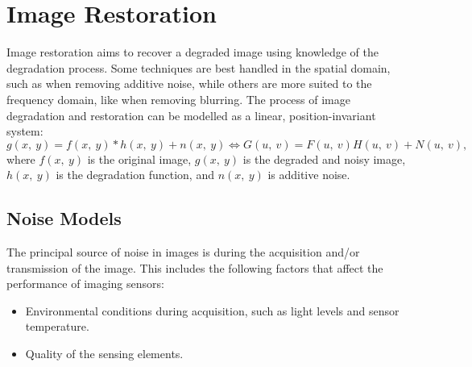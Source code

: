 \documentclass{article}
\begin{document}
\section{Image Restoration}
Image restoration aims to recover a degraded image using knowledge of
the degradation process. Some techniques are best handled in the
spatial domain, such as when removing additive noise, while others are
more suited to the frequency domain, like when removing blurring. The
process of image degradation and restoration can be modelled as a
linear, position-invariant system:
\begin{equation*}
    g\left( x,\: y \right) = f\left( x,\: y \right) \ast h\left( x,\: y \right) + n\left( x,\: y \right) \iff G\left( u,\: v \right) = F\left( u,\: v \right) H\left( u,\: v \right) + N\left( u,\: v \right),
\end{equation*}
where \(f\left( x,\: y \right)\) is the original image, \(g\left( x,\:
y \right)\) is the degraded and noisy image, \(h\left( x,\: y \right)\)
is the degradation function, and \(n\left( x,\: y \right)\) is
additive noise.
\subsection{Noise Models}
The principal source of noise in images is during the acquisition
and/or transmission of the image. This includes the following factors
that affect the performance of imaging sensors:
\begin{itemize}
    \item Environmental conditions during acquisition, such as light
          levels and sensor temperature.
    \item Quality of the sensing elements.
\end{itemize}
\end{document}
